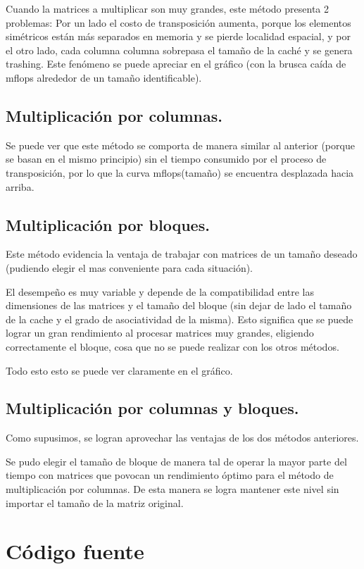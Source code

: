 \documentclass[a4paper,10pt]{article}
\begin{document}
Cuando la matrices a multiplicar son muy grandes, este método presenta 2 problemas: Por un lado el costo de transposición aumenta, porque los elementos simétricos están más separados en memoria y se pierde localidad espacial, y por el otro lado, cada columna columna sobrepasa el tamaño de la caché y se genera trashing. Este fenómeno se puede apreciar en el gráfico (con la brusca caída de mflops alrededor de un tamaño identificable).

\subsection{Multiplicación por columnas.}

Se puede ver que este método se comporta de manera similar al anterior (porque se basan en el mismo principio) sin el tiempo consumido por el proceso de transposición, por lo que la curva mflops(tamaño) se encuentra desplazada hacia arriba.

\subsection{Multiplicación por bloques.}

Este método evidencia la ventaja de trabajar con matrices de un tamaño deseado (pudiendo elegir el mas conveniente para cada situación).

El desempeño es muy variable y depende de la compatibilidad entre las dimensiones de las matrices y el tamaño del bloque (sin dejar de lado el tamaño de la cache y el grado de asociatividad de la misma). Esto significa que se puede lograr un gran rendimiento al procesar matrices muy grandes, eligiendo correctamente el bloque, cosa que no se puede realizar con los otros métodos. 

Todo esto esto se puede ver claramente en el gráfico.

\subsection{Multiplicación por columnas y bloques.}

Como supusimos, se logran aprovechar las ventajas de los dos métodos anteriores. 

Se pudo elegir el tamaño de bloque de manera tal de operar la mayor parte del tiempo con matrices que povocan un rendimiento óptimo para el método de multiplicación por columnas. De esta manera se logra mantener este nivel sin importar el tamaño de la matriz original.

\clearpage
\section{Código fuente}
\end{document}

